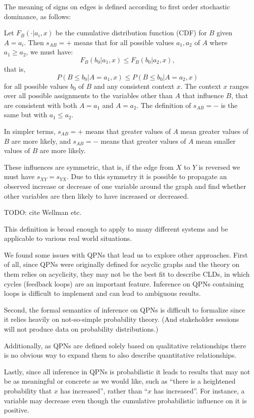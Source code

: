 \documentclass[]{article}
\begin{document}
The meaning of signs on edges is defined according to first order
stochastic dominance, as follows:

Let $F_B(\cdot|a_i, x)$ be the cumulative distribution function (CDF) for
$B$ given $A=a_i$. Then $s_{AB}=+$ means that for all possible values
$a_1,a_2$ of $A$ where $a_1\geq a_2$, we must have:
\[F_B(b_0|a_1, x)\leq F_B(b_0|a_2, x),\]
that is,
\[P(B \leq b_0| A = a_1, x)\leq P(B\leq b_0| A = a_2, x)\]
for all possible values $b_0$ of $B$ and any consistent context $x$.
The context $x$ ranges over all possible assignments to the
variables other than $A$ that influence $B$, that are consistent with both
$A=a_1$ and $A=a_2$.
%
The definition of $s_{AB}=-$ is the same but with $a_1\leq a_2$.

In simpler terms, $s_{AB} = +$ means that greater values of $A$ mean
greater values of $B$ are more likely, and $s_{AB}=-$ means that
greater values of $A$ mean smaller values of $B$ are more likely.

These influences are symmetric, that is, if the edge from $X$ to $Y$ is reversed
we must have $s_{XY} = s_{YX}$.
%
Due to this symmetry it is possible to propagate an observed increase
or decrease of one variable around the graph and find whether other
variables are then likely to have increased or decreased.

TODO: cite Wellman etc.

This definition is broad enough to
apply to many different systems and
be applicable to various real world situations.

We found some issues with QPNs that lead us to explore other
approaches.
%
First of all, since QPNs were originally defined for acyclic graphs
and the theory on them relies on acyclicity, they may not be the best
fit to describe CLDs, in which cycles (feedback loops) are an important
feature.
%
Inference on QPNs containing loops is difficult to implement and can
lead to ambiguous results.

Second, the formal semantics of inference on QPNs is difficult to
formalize since it relies heavily on not-so-simple probability theory.
%
(And stakeholder sessions will not produce data on probability
distributions.)

Additionally, as QPNs are defined solely based on qualitative
relationships there is no obvious way to expand them to also describe
quantitative relationships.

Lastly, since all inference in QPNs is probabilistic it leads to
results that may not be as meaningful or concrete as we would like,
such as ``there is a heightened probability that $x$ has increased'',
rather than ``$x$ has increased''.
%
For instance, a variable may decrease even though the cumulative
probabilistic influence on it is positive.
\end{document}
